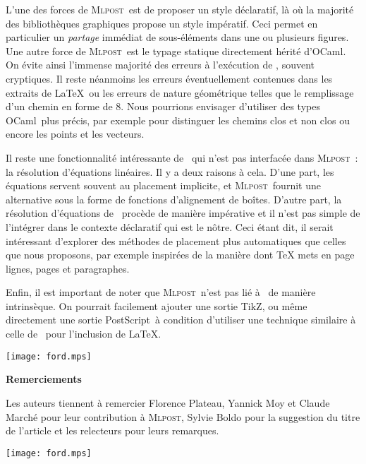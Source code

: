 \documentclass[twoside]{studia-Hermann}
\newcommand{\ocaml}{OCaml}
\newcommand{\mlpost}{\textsc{Mlpost}}
\newcommand{\metapost}{\MP}
\newcommand{\nomdetikz}{\textsf{TikZ}}
\newcommand{\postscript}{PostScript}
\begin{document}
L'une des forces de \mlpost\ est de proposer un style déclaratif, là
où la majorité des bibliothèques graphiques propose un style
impératif. Ceci permet en particulier un \emph{partage} immédiat de
sous-éléments dans une ou plusieurs figures.
Une autre force de \mlpost\ est le typage statique directement hérité
d'\ocaml. On évite ainsi l'immense majorité des erreurs à l'exécution
de \metapost, souvent cryptiques. Il reste néanmoins les erreurs
éventuellement contenues dans les extraits de \LaTeX\ ou les erreurs
de nature géométrique telles que le remplissage d'un chemin en forme
de 8. Nous pourrions envisager d'utiliser des types \ocaml\ plus
précis, par exemple pour distinguer les chemins clos et non clos ou
encore les points et les vecteurs.

Il reste une fonctionnalité intéressante de \metapost\ qui n'est pas
interfacée dans \mlpost~: la résolution d'équations linéaires.  Il y a
deux raisons à cela. D'une part, les équations servent souvent au
placement implicite, et \mlpost\ fournit une alternative sous la forme
de fonctions d'alignement de boîtes. D'autre part, la résolution
d'équations de \metapost\ procède de manière impérative et il n'est
pas simple de l'intégrer dans le contexte déclaratif qui est le nôtre.
Ceci étant dit, il serait intéressant d'explorer des méthodes de
placement plus automatiques que celles que nous proposons, par exemple
inspirées de la manière dont \TeX{} mets en page lignes, pages et
paragraphes.

Enfin, il est important de noter que \mlpost\ n'est pas lié à
\metapost\ de manière intrinsèque. On pourrait facilement ajouter une
sortie \nomdetikz, ou même directement une sortie \postscript\ à
condition d'utiliser une technique similaire à celle de \metapost\
pour l'inclusion de \LaTeX.

\medskip
\noindent
\begin{center}
  \texttt{[image: ford.mps]}

\medskip
\begin{minipage}{0.7\textwidth}
  \begin{center}
    \bf Remerciements
  \end{center}
  \centering Les auteurs tiennent à remercier Florence Plateau,
  Yannick Moy et Claude Marché pour leur contribution à \mlpost,
  Sylvie Boldo pour la suggestion du titre de l'article et les
  relecteurs pour leurs remarques.
\end{minipage}

\medskip
  \texttt{[image: ford.mps]}
\end{center}




\vfill

\end{document}
